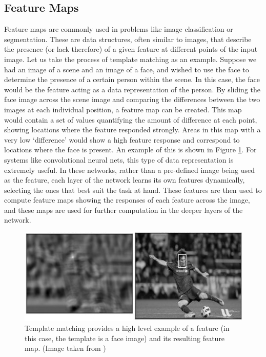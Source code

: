 \documentclass[11pt,a4paper,oldfontcommands]{memoir}
\begin{document}
\subsection{Feature Maps}
Feature maps are commonly used in problems like image classification or segmentation. These are data structures, often similar to images, that describe the presence (or lack therefore) of a given feature at different points of the input image. Let us take the process of template matching as an example. Suppose we had an image of a scene and an image of a face, and wished to use the face to determine the presence of a certain person within the scene. In this case, the face would be the feature acting as a data representation of the person. By sliding the face image across the scene image and comparing the differences between the two images at each individual position, a feature map can be created. This map would contain a set of values quantifying the amount of difference at each point, showing locations where the feature responded strongly. Areas in this map with a very low `difference' would show a high feature response and correspond to locations where the face is present. An example of this is shown in Figure \ref{fig:template_matching}. For systems like convolutional neural nets, this type of data representation is extremely useful. In these networks, rather than a pre-defined image being used as the feature, each layer of the network learns its own features dynamically, selecting the ones that best suit the task at hand. These features are then used to compute feature maps showing the responses of each feature across the image, and these maps are used for further computation in the deeper layers of the network.

\begin{figure}
    \centering
    \includegraphics[width=35em]{Images/template_ccoeff_1.jpg}
    \caption{Template matching provides a high level example of a feature (in this case, the template is a face image) and its resulting feature map. (Image taken from \cite{opencv})}
    \label{fig:template_matching}
\end{figure}
\end{document}

